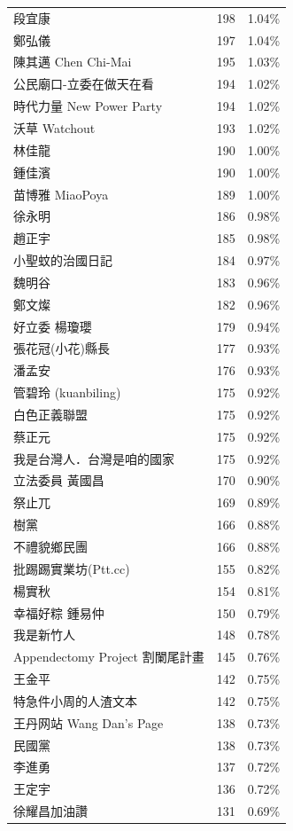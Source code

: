 \documentclass[letterpaper, 10pt, conference]{ieeeconf}   %
\begin{document}
\begin{CJK}{UTF8}{bsmi}
\begin{longtable}[c]{@{}lcc@{}}
段宜康 & 198 & 1.04\% \\
鄭弘儀 & 197 & 1.04\% \\
陳其邁 Chen Chi-Mai & 195 & 1.03\% \\
公民廟口-立委在做天在看 & 194 & 1.02\% \\
時代力量 New Power Party & 194 & 1.02\% \\
沃草 Watchout & 193 & 1.02\% \\
林佳龍 & 190 & 1.00\% \\
鍾佳濱 & 190 & 1.00\% \\
苗博雅 MiaoPoya & 189 & 1.00\% \\
徐永明 & 186 & 0.98\% \\
趙正宇 & 185 & 0.98\% \\
小聖蚊的治國日記 & 184 & 0.97\% \\
魏明谷 & 183 & 0.96\% \\
鄭文燦 & 182 & 0.96\% \\
好立委 楊瓊瓔 & 179 & 0.94\% \\
張花冠(小花)縣長 & 177 & 0.93\% \\
潘孟安 & 176 & 0.93\% \\
管碧玲 (kuanbiling) & 175 & 0.92\% \\
白色正義聯盟 & 175 & 0.92\% \\
蔡正元 & 175 & 0.92\% \\
我是台灣人．台灣是咱的國家 & 175 & 0.92\% \\
立法委員 黃國昌 & 170 & 0.90\% \\
祭止兀 & 169 & 0.89\% \\
樹黨 & 166 & 0.88\% \\
不禮貌鄉民團 & 166 & 0.88\% \\
批踢踢實業坊(Ptt.cc) & 155 & 0.82\% \\
楊實秋 & 154 & 0.81\% \\
幸福好粽 鍾易仲 & 150 & 0.79\% \\
我是新竹人 & 148 & 0.78\% \\
Appendectomy Project 割闌尾計畫 & 145 & 0.76\% \\
王金平 & 142 & 0.75\% \\
特急件小周的人渣文本 & 142 & 0.75\% \\
王丹网站 Wang Dan's Page & 138 & 0.73\% \\
民國黨 & 138 & 0.73\% \\
李進勇 & 137 & 0.72\% \\
王定宇 & 136 & 0.72\% \\
徐耀昌加油讚 & 131 & 0.69\% \\

\end{longtable}
\end{CJK}
\end{document}
